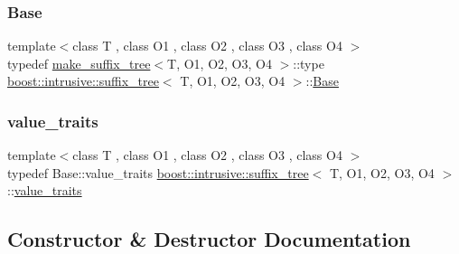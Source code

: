 \subsubsection{\texorpdfstring{Base}{Base}}
{\footnotesize\ttfamily template$<$class T , class O1 , class O2 , class O3 , class O4 $>$ \\
typedef \hyperlink{structboost_1_1intrusive_1_1make__suffix__tree}{make\+\_\+suffix\+\_\+tree}$<$T, O1, O2, O3, O4 $>$\+::type \hyperlink{classboost_1_1intrusive_1_1suffix__tree}{boost\+::intrusive\+::suffix\+\_\+tree}$<$ T, O1, O2, O3, O4 $>$\+::\hyperlink{classboost_1_1intrusive_1_1suffix__tree_a4e4d560ba016e68c15ecf4c4f88331e5}{Base}}

\mbox{\label{classboost_1_1intrusive_1_1suffix__tree_a20b10e59065c1615575e5f76038289fd}} 
\subsubsection{\texorpdfstring{value\+\_\+traits}{value\_traits}}
{\footnotesize\ttfamily template$<$class T , class O1 , class O2 , class O3 , class O4 $>$ \\
typedef Base\+::value\+\_\+traits \hyperlink{classboost_1_1intrusive_1_1suffix__tree}{boost\+::intrusive\+::suffix\+\_\+tree}$<$ T, O1, O2, O3, O4 $>$\+::\hyperlink{classboost_1_1intrusive_1_1suffix__tree_a20b10e59065c1615575e5f76038289fd}{value\+\_\+traits}}



\subsection{Constructor \& Destructor Documentation}
\mbox{\label{classboost_1_1intrusive_1_1suffix__tree_a3a428cbd18b652d8bfea604a3edb0414}} 
